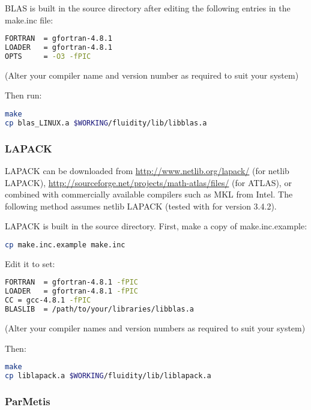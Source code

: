 BLAS is built in the source directory after editing the following entries in
the make.inc file:

\begin{lstlisting}[language=bash]
FORTRAN  = gfortran-4.8.1
LOADER   = gfortran-4.8.1
OPTS     = -O3 -fPIC
\end{lstlisting}

(Alter your compiler name and version number as required to suit your system)

Then run:

\begin{lstlisting}[language=bash]
make
cp blas_LINUX.a $WORKING/fluidity/lib/libblas.a
\end{lstlisting}

\subsubsection{LAPACK}
\label{sec:required_libraries_numerical_lapack}

LAPACK can be downloaded from \url{http://www.netlib.org/lapack/} (for netlib
LAPACK), \url{http://sourceforge.net/projects/math-atlas/files/} (for ATLAS),
or combined with commercially available compilers such as MKL from Intel. The
following method assumes netlib LAPACK (tested with \fluidity for version
3.4.2).

LAPACK is built in the source directory. First, make a copy of
make.inc.example:

\begin{lstlisting}[language=bash]
cp make.inc.example make.inc
\end{lstlisting}

Edit it to set:

\begin{lstlisting}[language=bash]
FORTRAN  = gfortran-4.8.1 -fPIC
LOADER   = gfortran-4.8.1 -fPIC
CC = gcc-4.8.1 -fPIC
BLASLIB  = /path/to/your/libraries/libblas.a
\end{lstlisting}

(Alter your compiler names and version numbers as required to suit your system)

Then:

\begin{lstlisting}[language=bash]
make
cp liblapack.a $WORKING/fluidity/lib/liblapack.a
\end{lstlisting}

\subsubsection{ParMetis}
\label{sec:required_libraries_numerical_parmetis}

